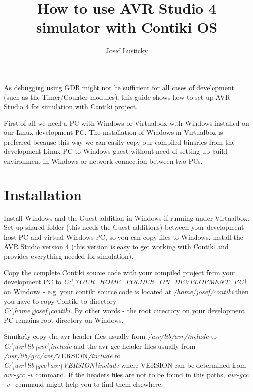\documentclass{article}
\begin{document}
\title{How to use AVR Studio 4 simulator with Contiki OS}
\author{Josef Lusticky}

\maketitle

As debugging using GDB might not be sufficient for all cases of development (such as the Timer/Counter modules),
this guide shows how to set up AVR Studio 4 for simulation with Contiki project.

First of all we need a PC with Windows or Virtualbox with Windows installed on our Linux development PC.
The installation of Windows in Virtualbox is preferred because this way we can easily copy our compiled binaries
from the development Linux PC to Windows guest
without need of setting up build environment in Windows or network connection between two PCs.

\section{Installation}
Install Windows and the Guest addition in Windows if running under Virtualbox.
Set up shared folder (this needs the Guest additions) between your development host PC and virtual Windows PC, so you can copy files to Windows.
Install the AVR Studio version 4 (this version is easy to get working with Contiki and provides everything needed for simulation).

Copy the complete Contiki source code with your compiled project from your development PC to
{\it{C:\textbackslash YOUR\_HOME\_FOLDER\_ON\_DEVELOPMENT\_PC\textbackslash}}
on Windows - e.g. your contiki source code is located at {\it{/home/josef/contiki}}
then you have to copy Contiki to directory \\
{\it{C:\textbackslash home\textbackslash josef\textbackslash contiki}}.
By other words - the root directory on your development PC remains root directory on Windows.

Similarly copy the avr header files usually from {\it{/usr/lib/avr/include}} to
{\it{C:\textbackslash usr\textbackslash lib\textbackslash avr\textbackslash include}}
and the avr-gcc header files usually from {\it{/usr/lib/gcc/avr/}}VERSION{\it{/include}} to \\
{\it{C:\textbackslash usr\textbackslash lib\textbackslash gcc\textbackslash avr\textbackslash VERSION\textbackslash include}}
where VERSION can be determined from {\it{avr-gcc -v}} command.
If the headers files are not to be found in this paths, {\it{avr-gcc -v }} command might help you to find them elsewhere.
\end{document}
